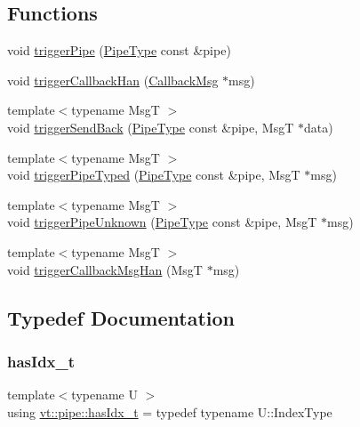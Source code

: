 \subsection*{Functions}
\begin{DoxyCompactItemize}
\item 
void \hyperlink{namespacevt_1_1pipe_ac55cd91c8aee610ae0e8b1843229a285}{trigger\+Pipe} (\hyperlink{namespacevt_ac9852acda74d1896f48f406cd72c7bd3}{Pipe\+Type} const \&pipe)
\item 
void \hyperlink{namespacevt_1_1pipe_af259c91e50470478594f47b11a8ecb88}{trigger\+Callback\+Han} (\hyperlink{structvt_1_1pipe_1_1_callback_msg}{Callback\+Msg} $\ast$msg)
\item 
{\footnotesize template$<$typename MsgT $>$ }\\void \hyperlink{namespacevt_1_1pipe_aa17c7b2572558dd48295d039f6f26c75}{trigger\+Send\+Back} (\hyperlink{namespacevt_ac9852acda74d1896f48f406cd72c7bd3}{Pipe\+Type} const \&pipe, MsgT $\ast$data)
\item 
{\footnotesize template$<$typename MsgT $>$ }\\void \hyperlink{namespacevt_1_1pipe_a1fea0e249e8f363c86cff32d9034238e}{trigger\+Pipe\+Typed} (\hyperlink{namespacevt_ac9852acda74d1896f48f406cd72c7bd3}{Pipe\+Type} const \&pipe, MsgT $\ast$msg)
\item 
{\footnotesize template$<$typename MsgT $>$ }\\void \hyperlink{namespacevt_1_1pipe_ae131e6afcc435107fcd51771caa9abc9}{trigger\+Pipe\+Unknown} (\hyperlink{namespacevt_ac9852acda74d1896f48f406cd72c7bd3}{Pipe\+Type} const \&pipe, MsgT $\ast$msg)
\item 
{\footnotesize template$<$typename MsgT $>$ }\\void \hyperlink{namespacevt_1_1pipe_a8be489288c5586b4a4d0daad173bc357}{trigger\+Callback\+Msg\+Han} (MsgT $\ast$msg)
\end{DoxyCompactItemize}


\subsection{Typedef Documentation}
\mbox{\label{namespacevt_1_1pipe_aec0e0e0847f490cd0b05c6d4e61003e9}} 
\subsubsection{\texorpdfstring{has\+Idx\+\_\+t}{hasIdx\_t}}
{\footnotesize\ttfamily template$<$typename U $>$ \\
using \hyperlink{namespacevt_1_1pipe_aec0e0e0847f490cd0b05c6d4e61003e9}{vt\+::pipe\+::has\+Idx\+\_\+t} = typedef typename U\+::\+Index\+Type}

